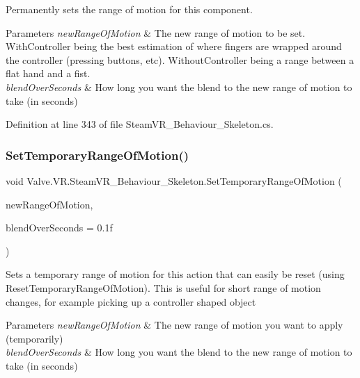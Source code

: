 Permanently sets the range of motion for this component. 


\begin{DoxyParams}{Parameters}
{\em new\+Range\+Of\+Motion} & The new range of motion to be set. With\+Controller being the best estimation of where fingers are wrapped around the controller (pressing buttons, etc). Without\+Controller being a range between a flat hand and a fist.\\
\hline
{\em blend\+Over\+Seconds} & How long you want the blend to the new range of motion to take (in seconds)\\
\hline
\end{DoxyParams}


Definition at line 343 of file Steam\+V\+R\+\_\+\+Behaviour\+\_\+\+Skeleton.\+cs.

\mbox{\label{class_valve_1_1_v_r_1_1_steam_v_r___behaviour___skeleton_acb49db7eda897b9e4d01867fcec6809c}} 
\subsubsection{\texorpdfstring{SetTemporaryRangeOfMotion()}{SetTemporaryRangeOfMotion()}}
{\footnotesize\ttfamily void Valve.\+V\+R.\+Steam\+V\+R\+\_\+\+Behaviour\+\_\+\+Skeleton.\+Set\+Temporary\+Range\+Of\+Motion (\begin{DoxyParamCaption}\item[{\mbox{\hyperlink{namespace_valve_1_1_v_r_affc8d18345f8f5d36f1ae7b4ce534500}{E\+V\+R\+Skeletal\+Motion\+Range}}}]{new\+Range\+Of\+Motion,  }\item[{float}]{blend\+Over\+Seconds = {\ttfamily 0.1f} }\end{DoxyParamCaption})}



Sets a temporary range of motion for this action that can easily be reset (using Reset\+Temporary\+Range\+Of\+Motion). This is useful for short range of motion changes, for example picking up a controller shaped object 


\begin{DoxyParams}{Parameters}
{\em new\+Range\+Of\+Motion} & The new range of motion you want to apply (temporarily)\\
\hline
{\em blend\+Over\+Seconds} & How long you want the blend to the new range of motion to take (in seconds)\\
\hline
\end{DoxyParams}


